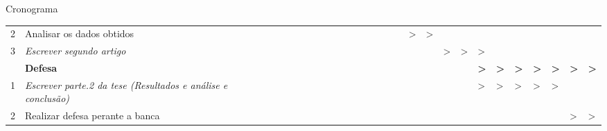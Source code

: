 \begin{frame}[c]{Cronograma}
\begin{table}[]
{\begin{tabular}{llll|llllllllllll|llllllllllll}
    2 & Analisar os dados obtidos &  &  &  &  &  &  &  &  &  &  &  &  &  &  &  & \textgreater{} & \textgreater{} &  &  &  &  &  &  &  &  &  \\
    3 & {\color[HTML]{3166FF} \textit{Escrever segundo artigo}} &  &  &  &  &  &  &  &  &  &  &  &  &  &  &  &  &  & \textgreater{} & \textgreater{} & \textgreater{} &  &  &  &  &  &  \\ \hline
     & \textbf{Defesa} &  &  &  &  &  &  &  &  &  &  &  &  &  &  &  &  &  &  &  & \textbf{\textgreater{}} & \textbf{\textgreater{}} & \textbf{\textgreater{}} & \textbf{\textgreater{}} & \textbf{\textgreater{}} & \textbf{\textgreater{}} & \textbf{\textgreater{}} \\ \hline
    1 & {\color[HTML]{3166FF} \textit{Escrever parte.2 da tese (Resultados e análise e conclusão)}} &  &  &  &  &  &  &  &  &  &  &  &  &  &  &  &  &  &  &  & \textgreater{} & \textgreater{} & \textgreater{} & \textgreater{} & \textgreater{} &  &  \\
    2 & {\color[HTML]{9A0000} Realizar defesa perante a banca} &  &  &  &  &  &  &  &  &  &  &  &  &  &  &  &  &  &  &  &  &  &  &  &  & \textgreater{} & \textgreater{}
    \end{tabular}
    }
\end{table}


\end{frame}
